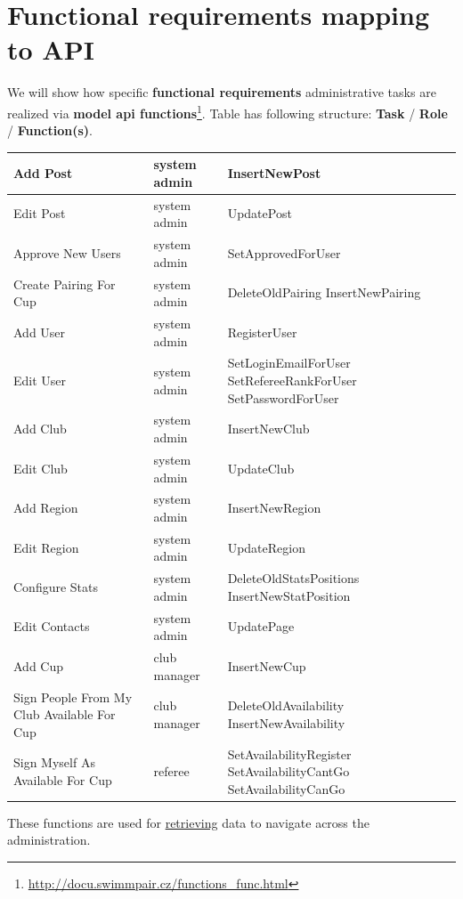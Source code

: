 \section {Functional requirements mapping to API}
We will show how specific \textbf{functional requirements} administrative tasks are realized via \textbf{model api functions}\footnote{\url{http://docu.swimmpair.cz/functions_func.html}}.
\newline
Table has following structure: \textbf{Task} / \textbf{Role} / \textbf{Function(s)}.
\newline
\begin{tabularx}{1.0\textwidth} { 
  | >{\raggedright\arraybackslash}X 
  | >{\centering\arraybackslash}X 
  | >{\raggedright\arraybackslash}X | }
 \hline
 Add Post & system admin& InsertNewPost \\
 \hline
 Edit Post  & system admin  & UpdatePost \\
 \hline
 Approve New Users & system admin & SetApprovedForUser \\
 \hline
 Create Pairing For Cup & system admin & DeleteOldPairing
InsertNewPairing\\
 \hline
 Add User & system admin & RegisterUser \\
 \hline
 Edit User & system admin &
 SetLoginEmailForUser
 SetRefereeRankForUser
 SetPasswordForUser\\
 \hline
 Add Club & system admin & InsertNewClub \\
 \hline
 Edit Club & system admin & UpdateClub \\
 \hline
 Add Region & system admin & InsertNewRegion \\
 \hline
 Edit Region & system admin & UpdateRegion \\
 \hline
 Configure Stats & system admin & DeleteOldStatsPositions
 InsertNewStatPosition \\
 \hline
 Edit Contacts & system admin & UpdatePage \\
 \hline
 Add Cup & club manager & InsertNewCup \\
 \hline
 Sign People From My Club Available For Cup & club manager & DeleteOldAvailability
 InsertNewAvailability \\
 \hline
 Sign Myself As Available For Cup & referee & SetAvailabilityRegister
 SetAvailabilityCantGo 
 SetAvailabilityCanGo \\
\hline
\end{tabularx}
\iffalse
These functions are used for \underline{retrieving} data to navigate across the administration.
